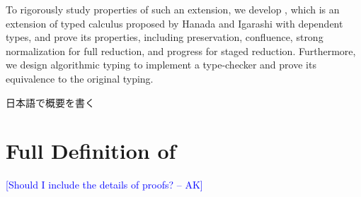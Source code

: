 \documentclass[master,english]{kuisthesis}
\newcommand{\AK}[1]{\textcolor{blue}{[#1 -- AK]}}
\begin{document}
\begin{eabstract}

To rigorously study properties of such an extension, we develop \LMD, which is
an extension of typed calculus \LTP proposed by Hanada and Igarashi with
dependent types, and prove its properties, including preservation,
confluence, strong normalization for full reduction, and progress for
staged reduction.  Furthermore, we design algorithmic typing to implement a
type-checker and prove its equivalence to the original typing. 



\end{eabstract}

\begin{jabstract}				%
日本語で概要を書く
\end{jabstract}

\tableofcontents				%


















\Appendix

\newtheorem{dfn}{Definition}
\newtheorem{ex}{Example}
\newtheorem{cm}{Comment}
\newcommand{\figheader}[2]{
  \begin{flushleft}
    #2 {\bf \normalsize #1}
\end{flushleft}}

\section{Full Definition of \LMD}


\AK{Should I include the details of proofs?}

% 
\end{document}
